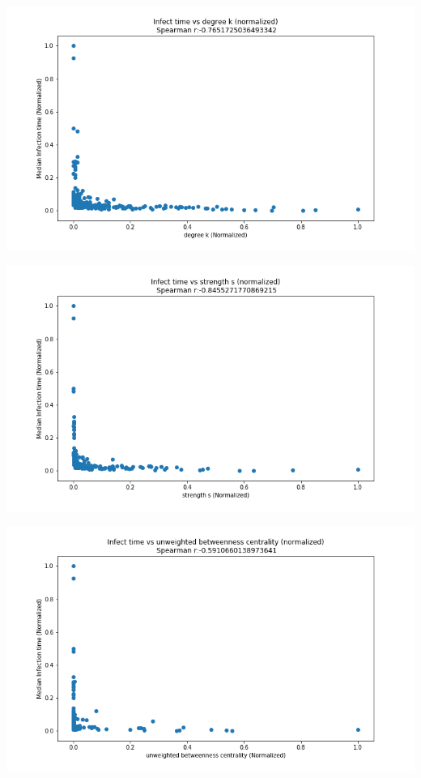\documentclass[a4paper,12pt]{article}
\begin{document}
  \begin{minipage}{0.5\textwidth}
    \includegraphics[width=\textwidth]{2}
  \end{minipage}
  \begin{minipage}{0.5\textwidth}
    \includegraphics[width=\textwidth]{3}
  \end{minipage}
  \begin{minipage}{0.5\textwidth}
    \includegraphics[width=\textwidth]{4}
  \end{minipage}
\end{document}
